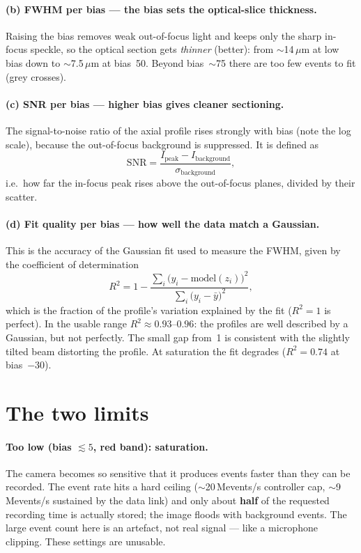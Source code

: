\documentclass[11pt,a4paper]{article}
\begin{document}
\paragraph{(b) FWHM per bias --- the bias sets the optical-slice thickness.}
Raising the bias removes weak out-of-focus light and keeps only the sharp in-focus speckle,
so the optical section gets \emph{thinner} (better): from $\sim$14\,$\mu$m at low bias down
to $\sim$7.5\,$\mu$m at bias~50. Beyond bias~$\sim$75 there are too few events to fit
(grey crosses).

\paragraph{(c) SNR per bias --- higher bias gives cleaner sectioning.}
The signal-to-noise ratio of the axial profile rises strongly with bias (note the log
scale), because the out-of-focus background is suppressed. It is defined as
\[
\mathrm{SNR}=\frac{I_\text{peak}-I_\text{background}}{\sigma_\text{background}},
\]
i.e.\ how far the in-focus peak rises above the out-of-focus planes, divided by their
scatter.

\paragraph{(d) Fit quality per bias --- how well the data match a Gaussian.}
This is the accuracy of the Gaussian fit used to measure the FWHM, given by the coefficient
of determination
\[
R^2 = 1-\frac{\sum_i \big(y_i-\text{model}(z_i)\big)^2}{\sum_i \big(y_i-\bar{y}\big)^2},
\]
which is the fraction of the profile's variation explained by the fit ($R^2=1$ is perfect).
In the usable range $R^2\approx 0.93$--$0.96$: the profiles are well described by a Gaussian,
but not perfectly. The small gap from~1 is consistent with the slightly tilted beam
distorting the profile. At saturation the fit degrades ($R^2=0.74$ at bias~$-30$).

\section{The two limits}\label{sec:sat}

\paragraph{Too low (bias $\lesssim 5$, red band): saturation.}
The camera becomes so sensitive that it produces events faster than they can be recorded.
The event rate hits a hard ceiling ($\sim$20\,Mevents/s controller cap, $\sim$9\,Mevents/s
sustained by the data link) and only about \textbf{half} of the requested recording time is
actually stored; the image floods with background events. The large event count here is an
artefact, not real signal --- like a microphone clipping. These settings are unusable.
\end{document}
